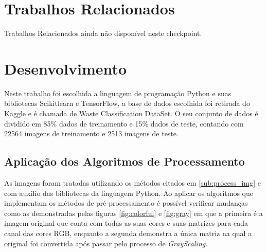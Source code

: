 \documentclass{article}
\begin{document}

\section{Trabalhos Relacionados}

Trabalhos Relacionados ainda não disponível neste checkpoint.

\section{Desenvolvimento}

Neste trabalho foi escolhida a linguagem de programação Python e suas bibliotecas Scikitlearn e TensorFlow, a base de dados escolhida foi retirada do Kaggle e é chamada de Waste Classification DataSet. O seu conjunto de dados é dividido em 85\% dados de treinamento e 15\% dados de teste, contando com 22564 imagens de treinamento e 2513 imagens de teste. 

\subsection{Aplicação dos Algoritmos de Processamento}
\label{sub:app_pross}
As imagens foram tratadas utilizando os métodos citados em \ref{sub:process_img} e com auxilio das bibliotecas da linguagem Python. Ao aplicar os algoritmos que implementam os métodos de pré-processamento é possível verificar mudanças como as demonstradas pelas figuras \ref{fig:colorful} e \ref{fig:gray} em que a primeira é a imagem original que conta com todas as suas cores e suas matrizes para cada canal das cores RGB, enquanto a segunda demonstra a única matriz na qual a original foi convertida após passar pelo processo de \textit{GrayScaling}.
\end{document}
